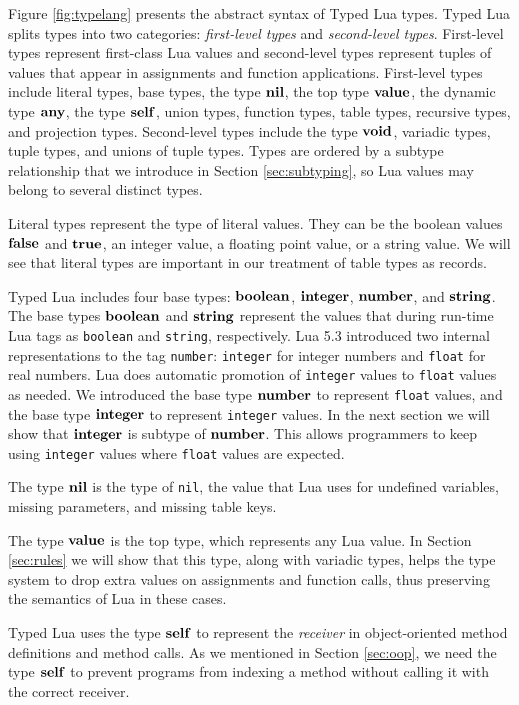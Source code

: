 Figure \ref{fig:typelang} presents the abstract syntax of
Typed Lua types.
Typed Lua splits types into two categories:
\emph{first-level types} and \emph{second-level types}.
First-level types represent first-class Lua values and
second-level types represent tuples of values that appear in 
assignments and function applications.
First-level types include literal types, base types, the type $\mathbf{nil}$,
the top type $\mathbf{value}$, the dynamic type $\mathbf{any}$, the type $\mathbf{self}$,
union types, function types, table types, recursive types, and
projection types.
Second-level types include the type $\mathbf{void}$, variadic types,
tuple types, and unions of tuple types.
Types are ordered by a subtype relationship that we introduce
in Section \ref{sec:subtyping}, so Lua values may belong to
several distinct types.

Literal types represent the type of literal values.
They can be the boolean values $\mathbf{false}$ and $\mathbf{true}$,
an integer value, a floating point value, or a string value.
We will see that literal types are important in our treatment of
table types as records.

Typed Lua includes four base types: $\mathbf{boolean}$, $\mathbf{integer}$, $\mathbf{number}$, and $\mathbf{string}$.
The base types $\mathbf{boolean}$ and $\mathbf{string}$ represent the values that during
run-time Lua tags as \texttt{boolean} and \texttt{string}, respectively.
Lua 5.3 introduced two internal representations to the tag \texttt{number}:
\texttt{integer} for integer numbers and \texttt{float} for real numbers.
Lua does automatic promotion of \texttt{integer} values to \texttt{float}
values as needed.
We introduced the base type $\mathbf{number}$ to represent \texttt{float} values,
and the base type $\mathbf{integer}$ to represent \texttt{integer} values.
In the next section we will show that $\mathbf{integer}$ is subtype of $\mathbf{number}$.
This allows programmers to keep using \texttt{integer} values where
\texttt{float} values are expected.

The type $\mathbf{nil}$ is the type of \texttt{nil}, the value that Lua uses for
undefined variables, missing parameters, and missing table keys.

The type $\mathbf{value}$ is the top type, which represents any Lua value.
In Section \ref{sec:rules} we will show that this type,
along with variadic types, helps the type system to drop extra values
on assignments and function calls, thus preserving the
semantics of Lua in these cases.

Typed Lua uses the type $\mathbf{self}$ to represent the \emph{receiver}
in object-oriented method definitions and method calls.
As we mentioned in Section \ref{sec:oop}, we need the type
$\mathbf{self}$ to prevent programs from indexing a method without
calling it with the correct receiver.

